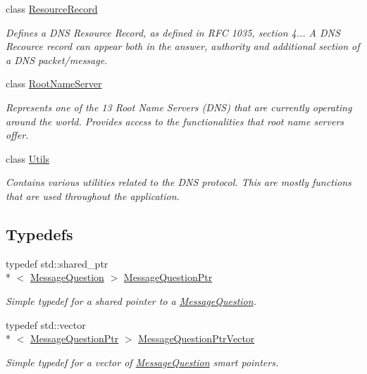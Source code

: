 \begin{DoxyCompactItemize}
class \hyperlink{class_senergy_1_1_dns_1_1_resource_record}{Resource\-Record}
\begin{DoxyCompactList}\small\item\em Defines a D\-N\-S Resource Record, as defined in R\-F\-C 1035, section 4... A D\-N\-S Recource record can appear both in the answer, authority and additional section of a D\-N\-S packet/message. \end{DoxyCompactList}\item 
class \hyperlink{class_senergy_1_1_dns_1_1_root_name_server}{Root\-Name\-Server}
\begin{DoxyCompactList}\small\item\em Represents one of the 13 Root Name Servers (D\-N\-S) that are currently operating around the world. Provides access to the functionalities that root name servers offer. \end{DoxyCompactList}\item 
class \hyperlink{class_senergy_1_1_dns_1_1_utils}{Utils}
\begin{DoxyCompactList}\small\item\em Contains various utilities related to the D\-N\-S protocol. This are mostly functions that are used throughout the application. \end{DoxyCompactList}\end{DoxyCompactItemize}
\subsection*{Typedefs}
\begin{DoxyCompactItemize}
\item 
typedef std\-::shared\-\_\-ptr\\*
$<$ \hyperlink{class_senergy_1_1_dns_1_1_message_question}{Message\-Question} $>$ \hyperlink{namespace_senergy_1_1_dns_a425a2a6f3b5c18973c524a99bdfa4ef0}{Message\-Question\-Ptr}
\begin{DoxyCompactList}\small\item\em Simple typedef for a shared pointer to a \hyperlink{class_senergy_1_1_dns_1_1_message_question}{Message\-Question}. \end{DoxyCompactList}\item 
typedef std\-::vector\\*
$<$ \hyperlink{namespace_senergy_1_1_dns_a425a2a6f3b5c18973c524a99bdfa4ef0}{Message\-Question\-Ptr} $>$ \hyperlink{namespace_senergy_1_1_dns_a76982150ca0b86c08d888f3e3e805747}{Message\-Question\-Ptr\-Vector}
\begin{DoxyCompactList}\small\item\em Simple typedef for a vector of \hyperlink{class_senergy_1_1_dns_1_1_message_question}{Message\-Question} smart pointers. \end{DoxyCompactList}\end{DoxyCompactItemize}
